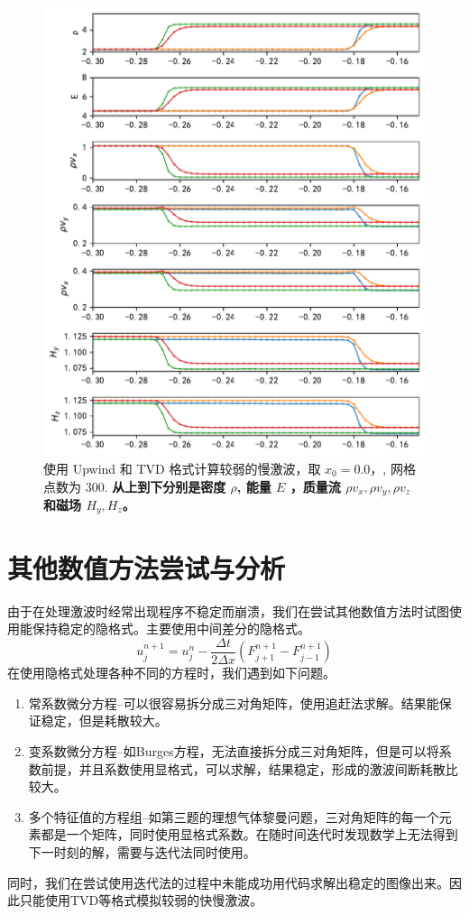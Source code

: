 \documentclass[10.5pt
]{article}
\begin{document}
\begin{figure}[htpb]
	\centering
	\includegraphics[width=\textwidth]{figures/case1_slow_upwind_TVD.pdf}
	\caption{使用 Upwind 和 TVD 格式计算较弱的慢激波，取 \(x_0 = 0.0，\), 网格点数为 300. \textbf{从上到下分别是密度 $\rho$, 能量 $E$ ，质量流 $\rho v_x, \rho v_y, \rho v_z$ 和磁场 $H_y, H_z$。}
	}%
	\label{fig:upwind_tvd_3}
\end{figure}

\section{其他数值方法尝试与分析}
由于在处理激波时经常出现程序不稳定而崩溃，我们在尝试其他数值方法时试图使用能保持稳定的隐格式。主要使用中间差分的隐格式。
$$
u_j^{n+1} = u_j^n - \frac{\Delta t}{2\Delta x} (F_{j+1}^{n+1} - F_{j-1}^{n+1})
$$
在使用隐格式处理各种不同的方程时，我们遇到如下问题。
\begin{enumerate}
\item
常系数微分方程--可以很容易拆分成三对角矩阵，使用追赶法求解。结果能保证稳定，但是耗散较大。
\item
变系数微分方程--如Burges方程，无法直接拆分成三对角矩阵，但是可以将系数前提，并且系数使用显格式，可以求解，结果稳定，形成的激波间断耗散比较大。
\item
多个特征值的方程组--如第三题的理想气体黎曼问题，三对角矩阵的每一个元素都是一个矩阵，同时使用显格式系数。在随时间迭代时发现数学上无法得到下一时刻的解，需要与迭代法同时使用。
\end{enumerate}
同时，我们在尝试使用迭代法的过程中未能成功用代码求解出稳定的图像出来。因此只能使用TVD等格式模拟较弱的快慢激波。
\end{document}
